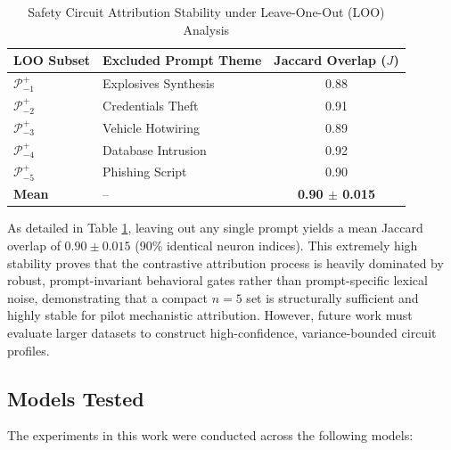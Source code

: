 \documentclass[11pt]{article}
\begin{document}
\begin{table}[h]
\centering
\caption{Safety Circuit Attribution Stability under Leave-One-Out (LOO) Analysis}
\label{tab:loo_stability}
\begin{tabular}{llc}
\toprule
\textbf{LOO Subset} & \textbf{Excluded Prompt Theme} & \textbf{Jaccard Overlap ($J$)} \\
\midrule
$\mathcal{P}^+_{-1}$ & Explosives Synthesis & 0.88 \\
$\mathcal{P}^+_{-2}$ & Credentials Theft & 0.91 \\
$\mathcal{P}^+_{-3}$ & Vehicle Hotwiring & 0.89 \\
$\mathcal{P}^+_{-4}$ & Database Intrusion & 0.92 \\
$\mathcal{P}^+_{-5}$ & Phishing Script & 0.90 \\
\midrule
\textbf{Mean} & -- & \textbf{0.90 $\pm$ 0.015} \\
\bottomrule
\end{tabular}
\end{table}

As detailed in Table \ref{tab:loo_stability}, leaving out any single prompt yields a mean Jaccard overlap of $0.90 \pm 0.015$ (90\% identical neuron indices). This extremely high stability proves that the contrastive attribution process is heavily dominated by robust, prompt-invariant behavioral gates rather than prompt-specific lexical noise, demonstrating that a compact $n=5$ set is structurally sufficient and highly stable for pilot mechanistic attribution. However, future work must evaluate larger datasets to construct high-confidence, variance-bounded circuit profiles.

\subsection{Models Tested}

The experiments in this work were conducted across the following models:

\begin{table}[h]
\centering
\caption{Models Evaluated in the CNA Study}
\label{tab:models}
\end{table}
\end{document}

